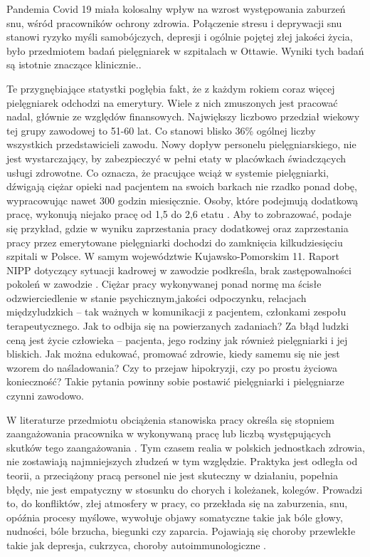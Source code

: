 \documentclass[a4paper,12pt,twoside,openright]{mwrep}
\begin{document}
Pandemia Covid 19 miała kolosalny wpływ na wzrost występowania zaburzeń snu, wśród pracowników ochrony zdrowia. Połączenie stresu i deprywacji snu stanowi ryzyko myśli samobójczych, depresji i ogólnie pojętej złej jakości życia, było przedmiotem badań pielęgniarek w szpitalach w Ottawie. Wyniki tych badań są istotnie znaczące klinicznie.\cite{sen}.

Te przygnębiające statystki pogłębia fakt, że z każdym rokiem coraz więcej pielęgniarek odchodzi na emerytury. Wiele z nich zmuszonych jest pracować nadal, głównie ze względów finansowych.  Największy liczbowo przedział wiekowy tej grupy zawodowej to 51-60 lat. Co stanowi blisko 36\% ogólnej liczby wszystkich przedstawicieli zawodu. Nowy dopływ personelu pielęgniarskiego, nie jest wystarczający, by zabezpieczyć w pełni etaty w placówkach świadczących usługi zdrowotne. Co oznacza, że pracujące wciąż w systemie pielęgniarki, dźwigają ciężar opieki nad pacjentem na swoich barkach nie rzadko ponad dobę, wypracowując nawet 300 godzin miesięcznie. Osoby, które podejmują dodatkową pracę, wykonują niejako pracę od 1,5 do 2,6 etatu \cite{cyfrowe}. Aby to zobrazować, podaje się przykład, gdzie w wyniku zaprzestania pracy dodatkowej oraz zaprzestania pracy przez emerytowane pielęgniarki dochodzi do zamknięcia kilkudziesięciu szpitali w Polsce. W samym województwie Kujawsko-Pomorskim 11. Raport NIPP dotyczący sytuacji kadrowej w zawodzie podkreśla, brak zastępowalności pokoleń w zawodzie \cite{statystyka}. Ciężar pracy wykonywanej ponad normę ma ścisłe odzwierciedlenie w  stanie psychicznym,jakości  odpoczynku, relacjach międzyludzkich – tak ważnych w komunikacji z pacjentem, członkami zespołu terapeutycznego. Jak to odbija się na powierzanych zadaniach? Za błąd ludzki ceną jest życie człowieka – pacjenta, jego rodziny jak również pielęgniarki i jej bliskich. Jak można edukować, promować zdrowie, kiedy samemu się nie jest wzorem do naśladowania? Czy to przejaw hipokryzji, czy po prostu życiowa konieczność? Takie pytania powinny sobie postawić pielęgniarki i pielęgniarze czynni zawodowo.

W literaturze przedmiotu obciążenia stanowiska pracy określa się stopniem zaangażowania pracownika w wykonywaną pracę lub liczbą występujących skutków tego zaangażowania \cite{stanowisko}. Tym czasem realia w polskich jednostkach zdrowia, nie zostawiają najmniejszych złudzeń w tym względzie. Praktyka jest odległa od teorii, a przeciążony pracą personel nie jest skuteczny w działaniu, popełnia błędy, nie jest empatyczny w stosunku do chorych i koleżanek, kolegów. Prowadzi to, do konfliktów, złej atmosfery w pracy, co przekłada się na zaburzenia, snu, opóźnia procesy myślowe, wywołuje objawy somatyczne takie jak bóle głowy, nudności, bóle brzucha, biegunki czy zaparcia. Pojawiają się choroby przewlekłe takie jak depresja, cukrzyca, choroby autoimmunologiczne \cite{zdrowie}.
\end{document}
